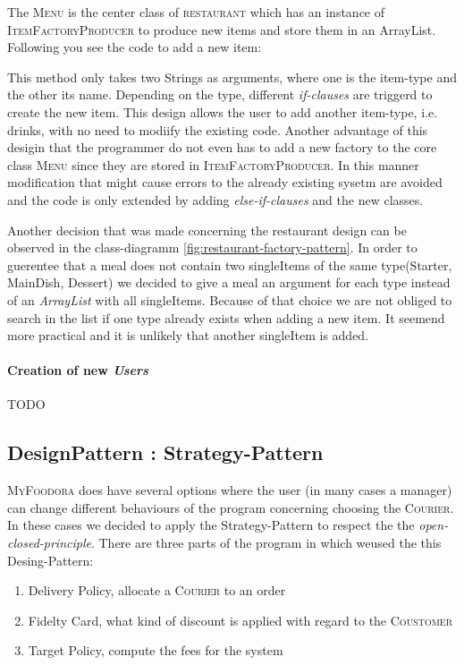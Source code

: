The \textsc{Menu} is the center class of \textsc{restaurant} which has an instance of 
\textsc{ItemFactoryProducer} to produce new items and store them in an ArrayList. Following you
see the code to add a new item:


This method only takes two Strings as arguments, where one is the item-type and the other its
name. Depending on the type, different \textit{if-clauses} are triggerd to create the new item.
This design allows the user to add another item-type, i.e. drinks, with no need to modiify the
existing code. Another advantage of this desigin that the programmer do not even has to add a new
factory to the core class \textsc{Menu} since they are stored in \textsc{ItemFactoryProducer}. In
this manner modification that might cause errors to the already existing sysetm are avoided and
the code is only extended by adding \textit{else-if-clauses} and the new classes. 

Another decision that was made concerning the restaurant design can be observed in the
class-diagramm \ref{fig:restaurant-factory-pattern}. In order to guerentee that a meal does not
contain two singleItems of the same type(Starter, MainDish, Dessert) we decided to give a meal an
argument for each type instead of an \textit{ArrayList} with all singleItems. Because of that
choice we are not obliged to search in the list if one type already exists when adding a new item.
It seemend more practical and it is unlikely that another singleItem is added.

\paragraph{Creation of new \textit{Users}}

TODO

\subsection{DesignPattern : Strategy-Pattern}
\label{sub:designpattern_strategy_pattern}

\textsc{MyFoodora} does have several options where the user (in many cases a manager) can change
different behaviours of the program concerning choosing the \textsc{Courier}. In these
cases we decided to apply the Strategy-Pattern to respect the the \textit{open-closed-principle}.
There are three parts of the program in which weused the this Desing-Pattern:
\begin{enumerate}
	\item Delivery Policy, allocate a \textsc{Courier} to an order
	\item Fidelty Card, what kind of discount is applied with regard to the
		\textsc{Coustomer}
	\item Target Policy, compute the fees for the system 
\end{enumerate}

